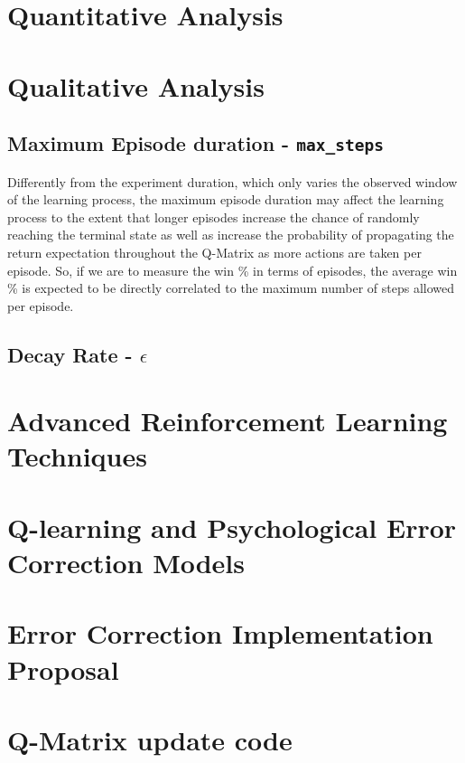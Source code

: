 \documentclass[11pt]{article}
\begin{document}
\section{Quantitative Analysis}
\section{Qualitative Analysis}
\subsection{Maximum Episode duration - \texttt{max\_steps}}
Differently from the experiment duration, which only varies the observed window of the learning process, the maximum episode duration may affect the learning process to the extent that longer episodes increase the chance of randomly reaching the terminal state as well as increase the probability of propagating the return expectation throughout the Q-Matrix as more actions are taken per episode. So, if we are to measure the win \% in terms of episodes, the average win \% is expected to be directly correlated to the maximum number of steps allowed per episode.

\subsection{Decay Rate - $\epsilon$}
\section{Advanced Reinforcement Learning Techniques}
\section{Q-learning and Psychological Error Correction Models}
\section{Error Correction Implementation Proposal}



\appendix
\section{Q-Matrix update code}
\end{document}
